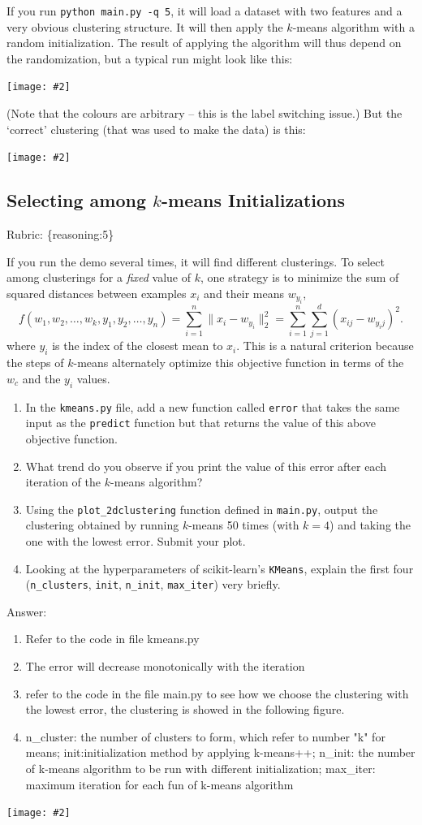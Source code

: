 \documentclass{article}
\def\rubric#1{\gre{Rubric: \{#1\}}}{}
\def\blu#1{{\color{blu}#1}}
\def\gre#1{{\color{gre}#1}}
\def\norm#1{\|#1\|}
\newcommand{\centerfig}[2]{\begin{center}\texttt{[image: \#2]}\end{center}}
\def\enum#1{\begin{enumerate}#1\end{enumerate}}
\begin{document}
If you run \verb|python main.py -q 5|, it will load a dataset with two features
and a very obvious clustering structure. It will then apply the $k$-means algorithm
with a random initialization. The result of applying the
algorithm will thus depend on the randomization, but a typical run might look like this:
\centerfig{.5}{../figs/kmeans_basic.png}
(Note that the colours are arbitrary -- this is the label switching issue.)
But the `correct' clustering (that was used to make the data) is this:
\centerfig{.5}{../figs/kmeans_good.png}


\subsection{Selecting among $k$-means Initializations}
\rubric{reasoning:5}

If you run the demo several times, it will find different clusterings. To select among clusterings for a \emph{fixed} value of $k$, one strategy is to minimize the sum of squared distances between examples $x_i$ and their means $w_{y_i}$,
\[
f(w_1,w_2,\dots,w_k,y_1,y_2,\dots,y_n) = \sum_{i=1}^n \norm{x_i - w_{y_i}}_2^2 = \sum_{i=1}^n \sum_{j=1}^d (x_{ij} - w_{y_ij})^2.
\]
 where $y_i$ is the index of the closest mean to $x_i$. This is a natural criterion because the steps of $k$-means alternately optimize this objective function in terms of the $w_c$ and the $y_i$ values.

 \blu{\enum{
 \item In the \texttt{kmeans.py} file, add a new function called \texttt{error} that takes the same input as the \texttt{predict} function but that returns the value of this above objective function.
 \item What trend do you observe if you print the value of this error after each iteration of the $k$-means algorithm?
 \item Using the \texttt{plot\_2dclustering} function defined in \texttt{main.py}, output the clustering obtained by running $k$-means 50 times (with $k=4$) and taking the one with the lowest error. Submit your plot.
 \item Looking at the hyperparameters of scikit-learn's \texttt{KMeans}, explain the first four (\texttt{n\_clusters}, \texttt{init}, \texttt{n\_init}, \texttt{max\_iter}) very briefly.
 }}


 \gre{ Answer:
 \begin{enumerate}
     \item Refer to the code in file kmeans.py
     \item The error will decrease monotonically with the iteration
     \item refer to the code in the file main.py to see how we choose the clustering with the lowest error, the clustering is showed in the following figure.
     \item n\_cluster: the number of clusters to form, which refer to number "k" for means; init:initialization method by applying k-means++; n\_init: the number of k-means algorithm to be run with different initialization; max\_iter: maximum iteration for each fun of k-means algorithm
 \end{enumerate}
 }
  \centerfig{.5}{../figs/kmeans_lowest_error.png}
\end{document}
